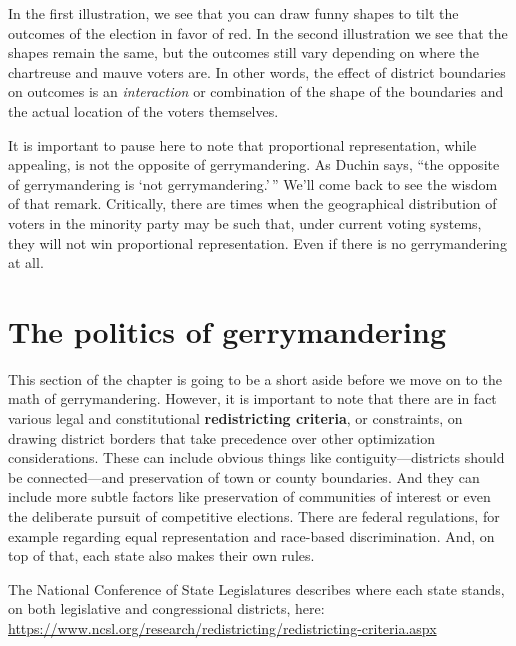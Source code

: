 \documentclass[
  openany]{book}
\begin{document}
In the first illustration, we see that you can draw funny shapes to tilt the outcomes of the election in favor of red. In the second illustration we see that the shapes remain the same, but the outcomes still vary depending on where the chartreuse and mauve voters are. In other words, the effect of district boundaries on outcomes is an \emph{interaction} or combination of the shape of the boundaries and the actual location of the voters themselves.

\begin{tipblock}
It is important to pause here to note that proportional representation, while appealing, is not the opposite of gerrymandering. As Duchin says, ``the opposite of gerrymandering is `not gerrymandering.'\,'' We'll come back to see the wisdom of that remark. Critically, there are times when the geographical distribution of voters in the minority party may be such that, under current voting systems, they will not win proportional representation. Even if there is no gerrymandering at all.

\end{tipblock}

\hypertarget{the-politics-of-gerrymandering}{%
\section*{The politics of gerrymandering}\label{the-politics-of-gerrymandering}}

This section of the chapter is going to be a short aside before we move on to the math of gerrymandering. However, it is important to note that there are in fact various legal and constitutional \textbf{redistricting criteria}, or constraints, on drawing district borders that take precedence over other optimization considerations. These can include obvious things like contiguity---districts should be connected---and preservation of town or county boundaries. And they can include more subtle factors like preservation of communities of interest or even the deliberate pursuit of competitive elections. There are federal regulations, for example regarding equal representation and race-based discrimination. And, on top of that, each state also makes their own rules.

The National Conference of State Legislatures describes where each state stands, on both legislative and congressional districts, here: \url{https://www.ncsl.org/research/redistricting/redistricting-criteria.aspx}
\end{document}
